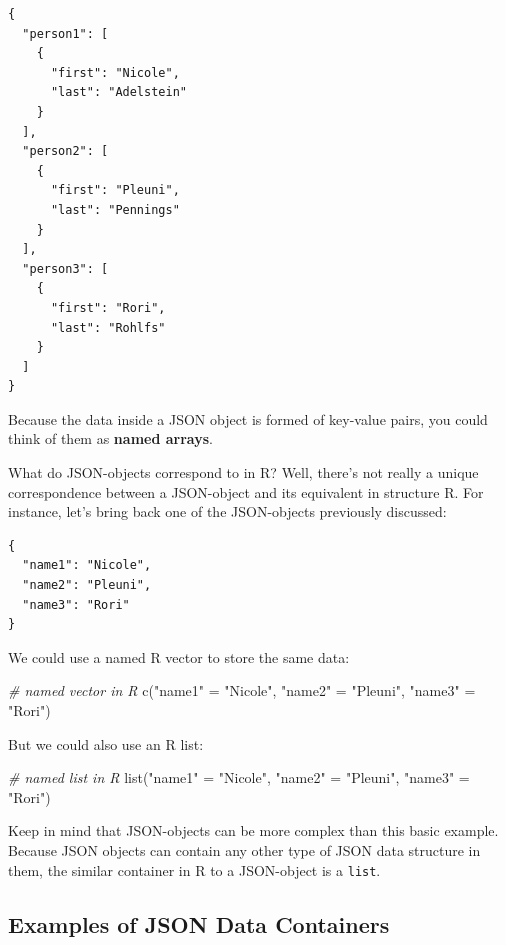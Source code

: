 \documentclass[
]{book}
\newenvironment{Shaded}{\begin{snugshade}}{\end{snugshade}}
\newcommand{\CommentTok}[1]{\textcolor[rgb]{0.56,0.35,0.01}{\textit{#1}}}
\newcommand{\FunctionTok}[1]{\textcolor[rgb]{0.00,0.00,0.00}{#1}}
\newcommand{\NormalTok}[1]{#1}
\newcommand{\OtherTok}[1]{\textcolor[rgb]{0.56,0.35,0.01}{#1}}
\newcommand{\StringTok}[1]{\textcolor[rgb]{0.31,0.60,0.02}{#1}}
\begin{document}
\begin{verbatim}
{
  "person1": [
    {
      "first": "Nicole",
      "last": "Adelstein"
    }
  ],
  "person2": [
    {
      "first": "Pleuni",
      "last": "Pennings"
    }
  ],
  "person3": [
    {
      "first": "Rori",
      "last": "Rohlfs"
    }
  ]
}
\end{verbatim}

Because the data inside a JSON object is formed of key-value pairs, you could
think of them as \textbf{named arrays}.

What do JSON-objects correspond to in R? Well, there's not really a unique
correspondence between a JSON-object and its equivalent in structure R. For
instance, let's bring back one of the JSON-objects previously discussed:

\begin{verbatim}
{
  "name1": "Nicole",
  "name2": "Pleuni",
  "name3": "Rori"
}
\end{verbatim}

We could use a named R vector to store the same data:

\begin{Shaded}
\begin{Highlighting}[]
\CommentTok{\# named vector in R}
\FunctionTok{c}\NormalTok{(}\StringTok{"name1"} \OtherTok{=} \StringTok{"Nicole"}\NormalTok{, }\StringTok{"name2"} \OtherTok{=} \StringTok{"Pleuni"}\NormalTok{, }\StringTok{"name3"} \OtherTok{=} \StringTok{"Rori"}\NormalTok{)}
\end{Highlighting}
\end{Shaded}

But we could also use an R list:

\begin{Shaded}
\begin{Highlighting}[]
\CommentTok{\# named list in R}
\FunctionTok{list}\NormalTok{(}\StringTok{"name1"} \OtherTok{=} \StringTok{"Nicole"}\NormalTok{, }\StringTok{"name2"} \OtherTok{=} \StringTok{"Pleuni"}\NormalTok{, }\StringTok{"name3"} \OtherTok{=} \StringTok{"Rori"}\NormalTok{)}
\end{Highlighting}
\end{Shaded}

Keep in mind that JSON-objects can be more complex than this basic example.
Because JSON objects can contain any other type of JSON data structure in them,
the similar container in R to a JSON-object is a \texttt{list}.

\hypertarget{examples-of-json-data-containers}{%
\subsection{Examples of JSON Data Containers}\label{examples-of-json-data-containers}}
\end{document}
